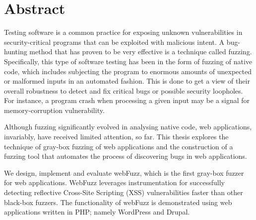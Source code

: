 \section*{\LARGE{Abstract}}

Testing software is a common practice for exposing unknown vulnerabilities
in security-critical programs that can be exploited with malicious intent.
A bug-hunting method that has proven to be very effective is a technique
called fuzzing. Specifically, this type of software testing has been in the
form of fuzzing of native code, which includes subjecting the program to
enormous amounts of unexpected or malformed inputs in an automated fashion.
This is done to get a view of their overall robustness to detect and fix
critical bugs or possible security loopholes. For instance, a program crash
when processing a given input may be a signal for memory-corruption
vulnerability.

Although fuzzing significantly evolved in analysing native code, web
applications, invariably, have received limited attention, so far. This thesis
explores the technique of gray-box fuzzing of web applications and the
construction of a fuzzing tool that automates the process of discovering
bugs in web applications.

We design, implement and evaluate webFuzz, which is the first gray-box
fuzzer for web applications. WebFuzz leverages instrumentation for successfully
detecting reflective Cross-Site Scripting (XSS) vulnerabilities faster than other
black-box fuzzers. The functionality of webFuzz is demonstrated using web applications
written in PHP; namely WordPress and Drupal.